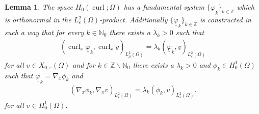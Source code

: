 \documentclass[a4paper,11pt]{article}
\newtheorem{lem}[thm]{Lemma}
\newcommand{\N}{\mathbb N}
\newcommand{\Z}{\mathbb Z}
\newcommand{\cu}{\operatorname{curl}}
\renewcommand{\vec}[1]{\underline{#1}}
\begin{document}
\begin{lem}\label{lem:FS-H_0curl}
	The space $H_0(\cu;\Omega)$ has a fundamental system $\{\vec \varphi_k\}_{k\in\Z}$ which is orthonormal in the  $L^2_{\varepsilon}(\Omega)$-product. Additionally  $\{\vec \varphi_k\}_{k\in\Z}$  is constructed in such a way that for every $k\in \N_0$ there exists a  $\lambda_k> 0$ such that
	\begin{align*}
		(\cu_x \vec \varphi_k,\cu_x \vec v)_{L^2_\mu(\Omega)} =  \lambda_k (\vec \varphi_k, \vec v)_{L^2_\varepsilon(\Omega)}
	\end{align*}
	for all $ \vec v\in X_{0,\varepsilon}(\Omega)$ and for $k\in \Z\backslash\N_0$ there exists a $\lambda_k>0$ and $\phi_k\in H^1_0(\Omega)$ such that $\vec \varphi_k = \nabla_x \phi_k$ and 
	\begin{align*}
		(\nabla_x\phi_k, \nabla_x v)_{L^2_\varepsilon(\Omega)} = \lambda_{k} (\phi_k, v)_{L^2_\varepsilon(\Omega)}.
	\end{align*}
	for all	$ v\in H^1_0(\Omega)$.
\end{lem}
\end{document}

